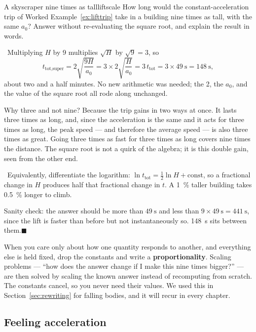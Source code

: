 \documentclass[11pt,twoside,openany]{book}
\newcounter{check}[chapter]
\newcommand{\viewtag}[3]{\fcolorbox{#2}{#3}{\footnotesize\textbf{\textcolor{#2}{#1}}}}
\newcommand{\elemtag}{\viewtag{Elementary}{elemcol}{elempale}}
\newcommand{\calctag}{\viewtag{Calculus}{calccol}{calcpale}}
\newcommand{\elem}{\par\medskip\noindent\elemtag\ }
\newcommand{\calc}{\par\medskip\noindent\calctag\ }
\newcommand{\qed}{\hfill$\blacksquare$}
\begin{document}
\begin{example}{A skyscraper nine times as tall}{liftscale}
How long would the constant-acceleration trip of Worked Example~\ref{ex:lifttrip} take in a building nine times as tall, with the same $a_0$? Answer without re-evaluating the square root, and explain the result in words.

\elem Multiplying $H$ by \num{9} multiplies $\sqrt{H}$ by $\sqrt9 = 3$, so
\[
t_{\text{tot,super}} = 2\sqrt{\frac{9H}{a_0}} = 3\times 2\sqrt{\frac{H}{a_0}} = 3\,t_{\text{tot}} = 3 \times \SI{49}{\second} = \SI{148}{\second},
\]
about two and a half minutes. No new arithmetic was needed; the \num{2}, the $a_0$, and the value of the square root all rode along unchanged.

Why three and not nine? Because the trip gains in two ways at once. It lasts three times as long, and, since the acceleration is the same and it acts for three times as long, the peak speed --- and therefore the average speed --- is also three times as great. Going three times as fast for three times as long covers nine times the distance. The square root is not a quirk of the algebra; it is this double gain, seen from the other end.

\calc Equivalently, differentiate the logarithm: $\ln t_{\text{tot}} = \tfrac12\ln H + \text{const}$, so a fractional change in $H$ produces half that fractional change in $t$. A \SI{1}{\percent} taller building takes \SI{0.5}{\percent} longer to climb.

Sanity check: the answer should be more than $\SI{49}{\second}$ and less than $9 \times \SI{49}{\second} = \SI{441}{\second}$, since the lift is faster than before but not instantaneously so. \SI{148}{\second} sits between them.\qed
\end{example}

\begin{keyidea}
When you care only about how one quantity responds to another, and everything else is held fixed, drop the constants and write a \textbf{proportionality}. Scaling problems --- ``how does the answer change if I make this nine times bigger?'' --- are then solved by scaling the known answer instead of recomputing from scratch. The constants cancel, so you never need their values. We used this in Section~\ref{sec:rewriting} for falling bodies, and it will recur in every chapter.
\end{keyidea}

\subsection{Feeling acceleration}
\end{document}
